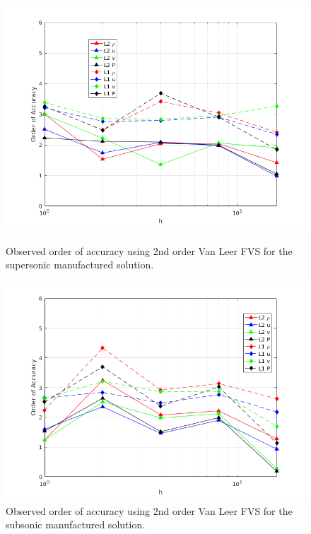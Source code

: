 \documentclass[]{aiaa-tc}%
\begin{document}
\begin{figure}[!htb]
  \label{fig:OASS}
  \centering
  \includegraphics[width=\linewidth]{figures/OA_SS}
  \caption{Observed order of accuracy using 2nd order Van Leer FVS for the supersonic manufactured solution.}
  \endminipage\hfill
  \label{fig:OASB}
  \centering
  \includegraphics[width=\linewidth]{figures/OA_SB}
  \caption{Observed order of accuracy using 2nd order Van Leer FVS for the subsonic manufactured solution.}
  \endminipage\hfill
\end{figure}
\end{document}
